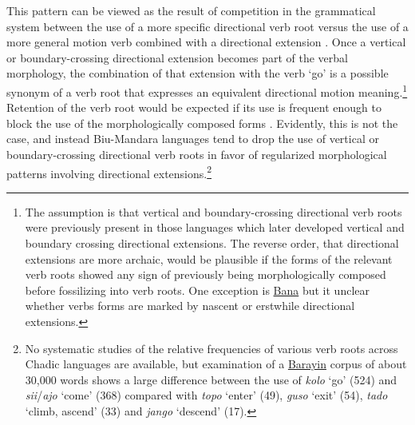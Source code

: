 This pattern can be viewed as the result of competition in the grammatical system between the use of a more specific directional verb root versus the use of a more general motion verb combined with a directional extension \citep{gardaniCompetitionMorphologyHistorical2019}. Once a vertical or boundary-crossing directional extension becomes part of the verbal morphology, the combination of that extension with the verb `go' is a possible synonym of a verb root that expresses an equivalent directional motion meaning.\footnote{The assumption is that vertical and boundary-crossing directional verb roots were previously present in those languages which later developed vertical and boundary crossing directional extensions. The reverse order, that directional extensions are more archaic, would be plausible if the forms of the relevant verb roots showed any sign of previously being morphologically composed before fossilizing into verb roots. One exception is \hyperref[bana]{Bana} but it unclear whether verbs forms are marked by nascent or erstwhile directional extensions.} Retention of the verb root would be expected if its use is frequent enough to block the use of the morphologically composed forms \citep{liebermanQuantifyingEvolutionaryDynamics2007,wuMorphologicalIrregularityCorrelates2019,smithRelationshipFrequencyIrregularity2023}. Evidently, this is not the case, and instead Biu-Mandara languages tend to drop the use of vertical or boundary-crossing directional verb roots in favor of regularized morphological patterns involving directional extensions.\footnote{No systematic studies of the relative frequencies of various verb roots across Chadic languages are available, but examination of a \hyperref[bara]{Barayin} corpus of about 30,000 words shows a large difference between the use of \textit{kolo} `go' (524) and \textit{sii}/\textit{ajo} `come' (368) compared with \textit{topo} `enter' (49), \textit{guso} `exit' (54), \textit{tado} `climb, ascend' (33) and \textit{jango} `descend' (17).}

